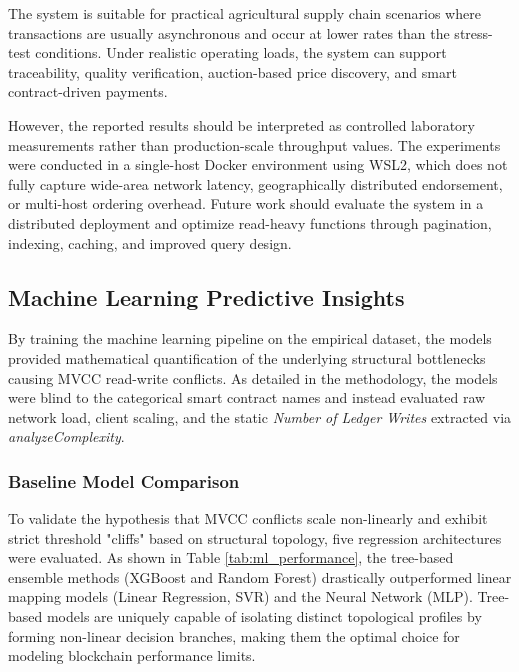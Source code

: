 \documentclass[12pt]{article}
\begin{document}
	The system is suitable for practical agricultural supply chain scenarios where transactions are usually asynchronous and occur at lower rates than the stress-test conditions. Under realistic operating loads, the system can support traceability, quality verification, auction-based price discovery, and smart contract-driven payments.
	
	However, the reported results should be interpreted as controlled laboratory measurements rather than production-scale throughput values. The experiments were conducted in a single-host Docker environment using WSL2, which does not fully capture wide-area network latency, geographically distributed endorsement, or multi-host ordering overhead. Future work should evaluate the system in a distributed deployment and optimize read-heavy functions through pagination, indexing, caching, and improved query design.
	
	\subsection{Machine Learning Predictive Insights}
	
	By training the machine learning pipeline on the empirical dataset, the models provided mathematical quantification of the underlying structural bottlenecks causing MVCC read-write conflicts. As detailed in the methodology, the models were blind to the categorical smart contract names and instead evaluated raw network load, client scaling, and the static \textit{Number of Ledger Writes} extracted via \textit{analyzeComplexity}.
	
	\subsubsection{Baseline Model Comparison}
	To validate the hypothesis that MVCC conflicts scale non-linearly and exhibit strict threshold "cliffs" based on structural topology, five regression architectures were evaluated. As shown in Table \ref{tab:ml_performance}, the tree-based ensemble methods (XGBoost and Random Forest) drastically outperformed linear mapping models (Linear Regression, SVR) and the Neural Network (MLP). Tree-based models are uniquely capable of isolating distinct topological profiles by forming non-linear decision branches, making them the optimal choice for modeling blockchain performance limits.
	
\end{document}

